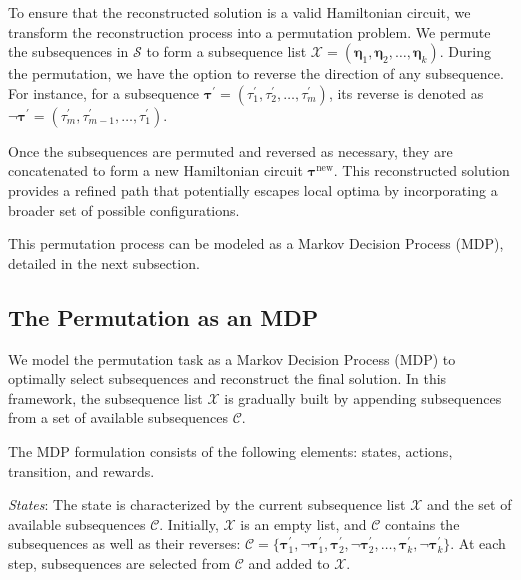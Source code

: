 To ensure that the reconstructed solution is a valid Hamiltonian circuit, we transform the reconstruction process into a permutation problem. We permute the subsequences in $\mathcal{S}$ to form a subsequence list $\mathcal{X}=(\boldsymbol{\eta}_{1}, \boldsymbol{\eta}_{2}, \dots, \boldsymbol{\eta}_{k})$. 
During the permutation, we have the option to reverse the direction of any subsequence.  
For instance, for a subsequence $\boldsymbol{\tau}^{\prime} = (\tau_1^{\prime}, \tau_2^{\prime}, \dots, \tau_{m}^{\prime})$, its reverse is denoted as $\neg \boldsymbol{\tau}^{\prime} = (\tau_{m}^{\prime}, \tau_{m-1}^{\prime}, \dots, \tau_{1}^{\prime})$. 

Once the subsequences are permuted and reversed as necessary, they are concatenated to form a new Hamiltonian circuit $\boldsymbol{\tau}^{\text{new}}$. This reconstructed solution provides a refined path that potentially escapes local optima by incorporating a broader set of possible configurations.

This permutation process can be modeled as a Markov Decision Process (MDP), detailed in the next subsection. 

\subsection{The Permutation as an MDP}
We model the permutation task as a Markov Decision Process (MDP) to optimally select subsequences and reconstruct the final solution. 
In this framework, %
the subsequence list $\mathcal{X}$ is gradually built by appending subsequences from a set of available subsequences $\mathcal{C}$.

The MDP  formulation consists of the following elements: states, actions, transition, and rewards. 

\textit{States}: The state is characterized by the current subsequence list $\mathcal{X}$ and the set of available subsequences $\mathcal{C}$.
Initially, $\mathcal{X}$ is an empty list, and $\mathcal{C}$ contains the subsequences as well as their reverses:
$\mathcal{C}=\{\boldsymbol{\tau}_{1}^{\prime}, \neg\boldsymbol{\tau}_{1}^{\prime}, \boldsymbol{\tau}_{2}^{\prime}, \neg\boldsymbol{\tau}_{2}^{\prime},\dots,\boldsymbol{\tau}_{k}^{\prime}, \neg\boldsymbol{\tau}_{k}^{\prime}\}$. 
At each step, subsequences are selected from $\mathcal{C}$ and added to $\mathcal{X}$.

